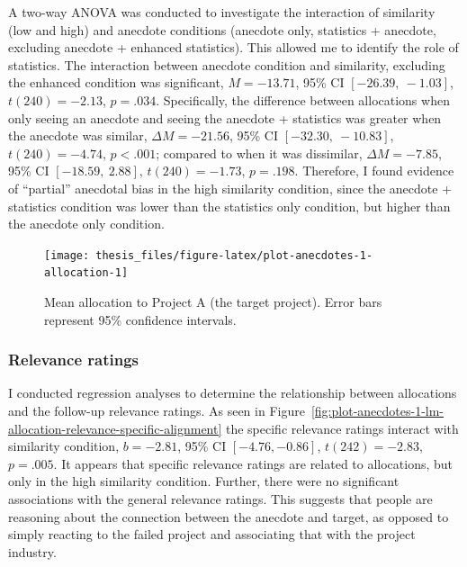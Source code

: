 \documentclass[a4paper, nobind, dvipsnames]{templates/ociamthesis}
\theoremstyle{definition}
\theoremstyle{definition}
\theoremstyle{definition}
\theoremstyle{definition}
\theoremstyle{remark}
\begin{document}
A two-way ANOVA was conducted to investigate the interaction of similarity (low
and high) and anecdote conditions (anecdote only, statistics + anecdote,
excluding anecdote + enhanced statistics). This allowed me to identify the role
of statistics. The interaction between anecdote condition and similarity,
excluding the enhanced condition was significant,
\(M = -13.71\), 95\% CI \([-26.39,~-1.03]\), \(t(240) = -2.13\), \(p = .034\). Specifically, the
difference between allocations when only seeing an anecdote and seeing the
anecdote + statistics was greater when the anecdote was similar,
\(\Delta M = -21.56\), 95\% CI \([-32.30,~-10.83]\), \(t(240) = -4.74\), \(p < .001\); compared to when it
was dissimilar, \(\Delta M = -7.85\), 95\% CI \([-18.59,~2.88]\), \(t(240) = -1.73\), \(p = .198\).
Therefore, I found evidence of ``partial'' anecdotal bias in the high similarity
condition, since the anecdote + statistics condition was lower than the
statistics only condition, but higher than the anecdote only condition.



\begin{figure}
\texttt{[image: thesis\_files/figure-latex/plot-anecdotes-1-allocation-1]} \caption{Mean allocation to Project A (the target project). Error bars represent 95\% confidence intervals.}\label{fig:plot-anecdotes-1-allocation}
\end{figure}

\hypertarget{relevance-ratings}{%
\subsubsection{Relevance ratings}\label{relevance-ratings}}

I conducted regression analyses to determine the relationship between
allocations and the follow-up relevance ratings. As seen in
Figure~\ref{fig:plot-anecdotes-1-lm-allocation-relevance-specific-alignment}
the specific relevance ratings interact with similarity condition,
\(b = -2.81\), 95\% CI \([-4.76, -0.86]\), \(t(242) = -2.83\), \(p = .005\). It appears
that specific relevance ratings are related to allocations, but only in the high
similarity condition. Further, there were no significant associations with the
general relevance ratings. This suggests that people are reasoning about the
connection between the anecdote and target, as opposed to simply reacting to the
failed project and associating that with the project industry.
\end{document}
